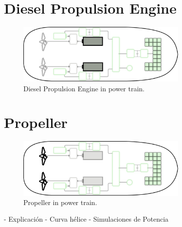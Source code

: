 \newpage

\section{Diesel Propulsion Engine}

\begin{figure}[!ht]
    \centering
    \includegraphics[width=0.75\textwidth]{images/chapter05/DieselEngine_scheme.jpg}
    \caption{Diesel Propulsion Engine in power train.}
    \label{Diesel Engine}
\end{figure}

\section{Propeller}

\begin{figure}[!ht]
    \centering
    \includegraphics[width=0.75\textwidth]{images/chapter05/Propeller_scheme.jpg}
    \caption{Propeller in power train.}
    \label{Propeller}
\end{figure}

- Explicación
- Curva hélice
- Simulaciones de Potencia